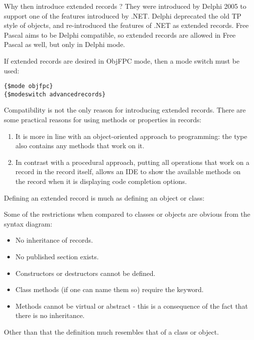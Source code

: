 Why then introduce extended records ? They were introduced by Delphi 
2005 to support one of the features introduced by .NET. Delphi deprecated
the old TP style of objects, and re-introduced the features of .NET as 
extended records. Free Pascal aims to be Delphi 
compatible, so extended records are allowed in Free Pascal as well, 
but only in Delphi mode.

If extended records are desired in ObjFPC mode, then a mode switch must be
used:
\begin{verbatim}
{$mode objfpc}
{$modeswitch advancedrecords}
\end{verbatim}

Compatibility is not the only reason for introducing extended records. 
There are some practical reasons for using methods or properties in records: 
\begin{enumerate}
\item It is more in line with an object-oriented approach to programming:
the type also contains any methods that work on it.
\item In contrast with a procedural approach, putting all operations that
work on a record in the record itself, allows an IDE to show the available
methods on the record when it is displaying code completion options.
\end{enumerate}

Defining an extended record is much as defining an object or class:

Some of the restrictions when compared to classes or objects are 
obvious from the syntax diagram:
\begin{itemize}
\item No inheritance of records.
\item No published section exists. 
\item Constructors or destructors cannot be defined.
\item Class methods (if one can name them so) require the  keyword.
\item Methods cannot be virtual or abstract - this is a consequence
of the fact that there is no inheritance.
\end{itemize}
Other than that the definition much resembles that of a class or object.


